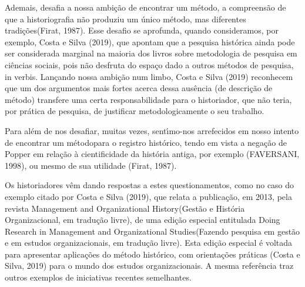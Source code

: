 \documentclass[
12pt,		%
openright,	%
twoside,  %
a4paper,			%
chapter=TITLE,		%
english,			%
french,				%
spanish,			%
brazil				%
]{USPSC-classe/USPSC}
\begin{document}
Ademais, desafia a nossa ambi\c{c}\~ao de \textquotedbl encontrar um m\'etodo\textquotedbl , a compreens\~ao de que a \textquotedbl historiografia n\~ao produziu um \'unico m\'etodo, mas diferentes tradi\c{c}\~oes\textquotedbl   (Firat, 1987).  Esse desafio se aprofunda, quando consideramos, por exemplo, Costa e Silva (2019), que apontam que a \textquotedbl pesquisa hist\'orica ainda pode ser considerada marginal na maioria dos livros sobre metodologia de pesquisa em ci\^encias sociais, pois n\~ao desfruta do espa\c{c}o dado a outros m\'etodos de pesquisa\textquotedbl , in verbis. Lan\c{c}ando nossa ambi\c{c}\~ao num limbo,  Costa e Silva (2019) reconhecem \textquotedbl que um dos argumentos mais fortes acerca dessa aus\^encia (de descri\c{c}\~ao de m\'etodo) transfere uma certa responsabilidade para o historiador, que n\~ao teria, por pr\'atica de pesquisa, de justificar metodologicamente o seu trabalho\textquotedbl .

















Para al\'em de nos desafiar, muitas vezes, sent\'{\i}mo-nos arrefecidos em nosso intento de \textquotedbl encontrar um m\'etodo\textquotedbl  para o registro hist\'orico, tendo em vista a nega\c{c}\~ao de Popper em rela\c{c}\~ao \`a cientificidade da hist\'oria antiga, por exemplo (FAVERSANI, 1998), ou mesmo de sua utilidade (Firat, 1987).

















Os historiadores v\^em dando respostas a estes questionamentos, como no caso do exemplo citado por  Costa e Silva (2019), que relata a publica\c{c}\~ao, em 2013, pela revista \textquotedbl Management and Organizational History\textquotedbl  (\textquotedbl Gest\~ao e Hist\'oria Organizacional\textquotedbl , em tradu\c{c}\~ao livre), de uma edi\c{c}\~ao especial entitulada \textquotedbl Doing Research in Management and Organizational Studies\textquotedbl  (\textquotedbl Fazendo pesquisa em gest\~ao e em estudos organizacionais\textquotedbl , em tradu\c{c}\~ao livre). Esta edi\c{c}\~ao especial \'e voltada para apresentar aplica\c{c}\~oes do m\'etodo hist\'orico, com orienta\c{c}\~oes pr\'aticas  (Costa e Silva, 2019) para o mundo dos estudos organizacionais. A mesma refer\^encia traz outros exemplos de iniciativas recentes semelhantes.
\end{document}
